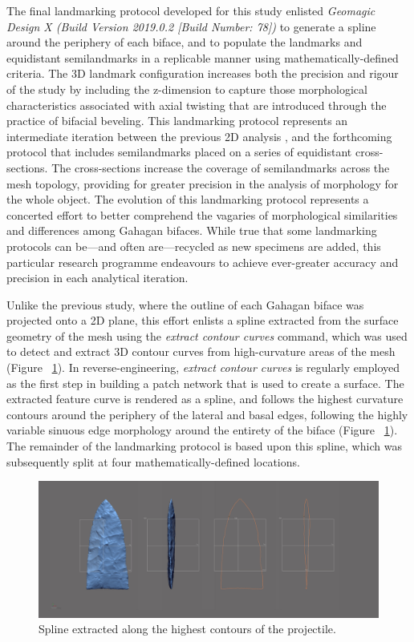 \documentclass[review]{elsarticle}
\begin{document}
The final landmarking protocol developed for this study \citep{RN20850} enlisted \textit{Geomagic Design X (Build Version 2019.0.2 [Build Number: 78])} to generate a spline around the periphery of each biface, and to populate the landmarks and equidistant semilandmarks in a replicable manner using mathematically-defined criteria. The 3D landmark configuration increases both the precision and rigour of the study by including the z-dimension to capture those morphological characteristics associated with axial twisting that are introduced through the practice of bifacial beveling. This landmarking protocol represents an intermediate iteration between the previous 2D analysis \citep{RN11783}, and the forthcoming protocol that includes semilandmarks placed on a series of equidistant cross-sections. The cross-sections increase the coverage of semilandmarks across the mesh topology, providing for greater precision in the analysis of morphology for the whole object. The evolution of this landmarking protocol represents a concerted effort to better comprehend the vagaries of morphological similarities and differences among Gahagan bifaces. While true that some landmarking protocols can be—and often are—recycled as new specimens are added, this particular research programme endeavours to achieve ever-greater accuracy and precision in each analytical iteration.

Unlike the previous study, where the outline of each Gahagan biface was projected onto a 2D plane, this effort enlists a spline extracted from the surface geometry of the mesh using the \textit{extract contour curves} command, which was used to detect and extract 3D contour curves from high-curvature areas of the mesh (Figure ~\ref{fig:fig-extractspline}). In reverse-engineering, \textit{extract contour curves} is regularly employed as the first step in building a patch network that is used to create a surface. The extracted feature curve is rendered as a spline, and follows the highest curvature contours around the periphery of the lateral and basal edges, following the highly variable sinuous edge morphology around the entirety of the biface (Figure ~\ref{fig:fig-extractspline}). The remainder of the landmarking protocol is based upon this spline, which was subsequently split at four mathematically-defined locations.

\begin{figure}[ht]\centering
\includegraphics[width=\linewidth]{analysis/images/extractspline.pdf}
\caption{Spline extracted along the highest contours of the projectile.}
\label{fig:fig-extractspline}
\end{figure}
\end{document}
